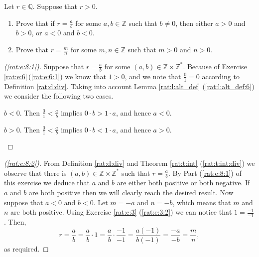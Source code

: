 \Newpage
\begin{exercise} %
	\label{rat:e:8}
	Let $r \in \mathbb{Q}$. Suppose that $r > 0$.
	\begin{enumerate}
		\item Prove that if $r = \frac{a}{b}$ for some $a, b \in \mathbb{Z}$ such that $b \neq 0$, then either $a > 0$ and $b > 0$, or $a < 0$ and $b < 0$. \label{rat:e:8:1}
		\item Prove that $r = \frac{m}{n}$ for some $m, n \in \mathbb{Z}$ such that $m > 0$ and $n > 0$. \label{rat:e:8:2}
	\end{enumerate}
\end{exercise}

\begin{proof}[(\ref{rat:e:8:1})]
	Suppose that $r = \frac{a}{b}$ for some $(a, b) \in \mathbb{Z} \times \mathbb{Z}^{*}$. Because of Exercise\,\ref{rat:e:6}\,(\ref{rat:e:6:1}) we know that $1 > 0$, and we note that $\frac{0}{1} = 0$ according to Definition \ref{rat:d:div}. Taking into account Lemma \ref{rat:l:alt_def} (\ref{rat:l:alt_def:6}) we consider the following two cases.
	\begin{bycases}
		\item $b < 0$. Then $\frac{0}{1} < \frac{a}{b}$ implies $0 \cdot b > 1 \cdot a$, and hence $a < 0$.
		\item $b > 0$. Then $\frac{0}{1} < \frac{a}{b}$ implies $0 \cdot b < 1 \cdot a$, and hence $a > 0$.
	\end{bycases}
\end{proof}

\begin{proof}[(\ref{rat:e:8:2})]
	From Definition \ref{rat:d:div} and Theorem \ref{rat:t:int} (\ref{rat:t:int:div}) we observe that there is ${(a, b) \in \mathbb{Z} \times \mathbb{Z}^{*}}$ such that $r = \frac{a}{b}$. By Part (\ref{rat:e:8:1}) of this exercise we deduce that $a$ and $b$ are either both positive or both negative. If $a$ and $b$ are both positive then we will clearly reach the desired result. Now suppose that $a < 0$ and $b < 0$. Let $m = -a$ and $n = -b$, which means that $m$ and $n$ are both positive. Using Exercise \ref{rat:e:3} (\ref{rat:e:3:2}) we can notice that $1 = \frac{-1}{-1}$. Then,
	$$
		r = \frac{a}{b} = \frac{a}{b} \cdot 1 = \frac{a}{b} \cdot \frac{-1}{-1} = \frac{a(-1)}{b(-1)} = \frac{-a}{-b} = \frac{m}{n},
	$$
	as required.
\end{proof}


